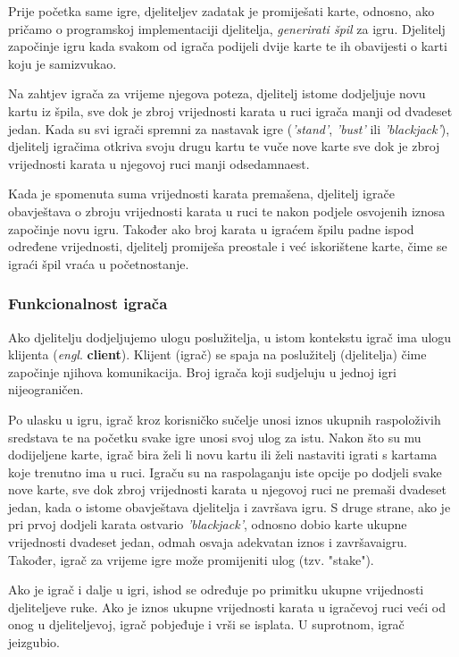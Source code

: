 \documentclass[conference]{IEEEtran}
\begin{document}
Prije početka same igre, djeliteljev zadatak je promiješati karte, odnosno, ako pričamo o programskoj implementaciji djelitelja, \textit{generirati špil} za igru. Djelitelj započinje igru kada svakom od igrača podijeli dvije karte te ih obavijesti o karti koju je sam\break izvukao.

Na zahtjev igrača za vrijeme njegova poteza, djelitelj istome dodjeljuje novu kartu iz špila, sve dok je zbroj vrijednosti karata u ruci igrača manji od dvadeset jedan. Kada su svi igrači spremni za nastavak igre (\textit{'stand'}, \textit{'bust'} ili \textit{'blackjack'}), djelitelj igračima otkriva svoju drugu kartu te vuče nove karte sve dok je zbroj vrijednosti karata u njegovoj ruci manji od\break sedamnaest.

Kada je spomenuta suma vrijednosti karata premašena, djelitelj igrače obavještava o zbroju vrijednosti karata u ruci te nakon podjele osvojenih iznosa započinje novu igru. Također ako broj karata u igraćem špilu padne ispod određene vrijednosti, djelitelj promiješa preostale i već iskorištene karte, čime se igraći špil vraća u početno\break stanje.


\subsubsection{Funkcionalnost igrača}

Ako djelitelju dodjeljujemo ulogu poslužitelja, u istom kontekstu igrač ima ulogu klijenta (\textit{engl}. \textbf{client}). Klijent (igrač) se spaja na poslužitelj (djelitelja) čime započinje njihova komunikacija. Broj igrača koji sudjeluju u jednoj igri nije\break ograničen. 

Po ulasku u igru, igrač kroz korisničko sučelje unosi iznos ukupnih raspoloživih sredstava te na početku svake igre unosi svoj ulog za istu. Nakon što su mu dodijeljene karte, igrač bira želi li novu kartu ili želi nastaviti igrati s kartama koje trenutno ima u ruci. Igraču su na raspolaganju iste opcije po dodjeli svake nove karte, sve dok zbroj vrijednosti karata u njegovoj ruci ne premaši dvadeset jedan, kada o istome obavještava djelitelja i završava igru. S druge strane, ako je pri prvoj dodjeli karata ostvario \textit{'blackjack'}, odnosno dobio karte ukupne vrijednosti dvadeset jedan, odmah osvaja adekvatan iznos i završava\break igru. Također, igrač za vrijeme igre može promijeniti ulog (tzv. "stake").

Ako je igrač i dalje u igri, ishod se određuje po primitku ukupne vrijednosti djeliteljeve ruke. Ako je iznos ukupne vrijednosti karata u igračevoj ruci veći od onog u djeliteljevoj, igrač pobjeđuje i vrši se isplata. U suprotnom, igrač je\break izgubio.
\end{document}
